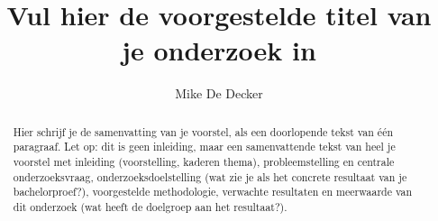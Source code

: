 \documentclass[english]{hogent-article}
\title{Vul hier de voorgestelde titel van je onderzoek in}
\author{Mike De Decker}
\begin{document}
\begin{abstract}
  Hier schrijf je de samenvatting van je voorstel, als een doorlopende tekst van één paragraaf. Let op: dit is geen inleiding, maar een samenvattende tekst van heel je voorstel met inleiding (voorstelling, kaderen thema), probleemstelling en centrale onderzoeksvraag, onderzoeksdoelstelling (wat zie je als het concrete resultaat van je bachelorproef?), voorgestelde methodologie, verwachte resultaten en meerwaarde van dit onderzoek (wat heeft de doelgroep aan het resultaat?).
\end{abstract}

\tableofcontents



\printbibliography[heading=bibintoc]
\end{document}
